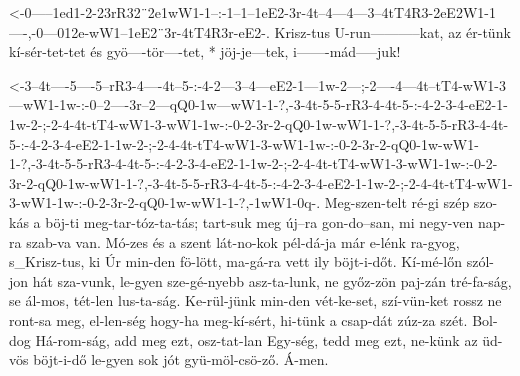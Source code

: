 





  {<-0-----1ed1-2-23rR32¨2e1wW1-1--:-1--1--1eE2-3r-4t--4---4---3--4tT4R3-2eE2W1-1----,-0---012e-wW1--1eE2¨3r-4tT4R3r-eE2-.}
  {  Krisz-tus  U-run-----------kat, az ér-tünk kí-sér-tet-tet és gyö----tör----tet, * jöj-je---tek, i-------mád-----juk!}



  {<-3--4t----5----5--rR3-4----4t--5-:-4-2---3--4---eE2-1---1w-2---;-2----4---4t--tT4-wW1-3---wW1-1w-:-0--2----3r--2---qQ0-1w---wW1-1-?,-3-4t-5-5-rR3-4-4t-5-:-4-2-3-4-eE2-1-1w-2-;-2-4-4t-tT4-wW1-3-wW1-1w-:-0-2-3r-2-qQ0-1w-wW1-1-?,-3-4t-5-5-rR3-4-4t-5-:-4-2-3-4-eE2-1-1w-2-;-2-4-4t-tT4-wW1-3-wW1-1w-:-0-2-3r-2-qQ0-1w-wW1-1-?,-3-4t-5-5-rR3-4-4t-5-:-4-2-3-4-eE2-1-1w-2-;-2-4-4t-tT4-wW1-3-wW1-1w-:-0-2-3r-2-qQ0-1w-wW1-1-?,-3-4t-5-5-rR3-4-4t-5-:-4-2-3-4-eE2-1-1w-2-;-2-4-4t-tT4-wW1-3-wW1-1w-:-0-2-3r-2-qQ0-1w-wW1-1-?,-1wW1-0q-.}
  {  Meg-szen-telt ré-gi  szép szo-kás a böj-ti meg-tar-tóz-ta-tás;  tart-suk meg új--ra  gon-do--san, mi negy-ven nap-ra  szab-va  van. Mó-zes és a szent lát-no-kok pél-dá-ja már e-lénk ra-gyog, s_Krisz-tus, ki Úr min-den fö-lött, ma-gá-ra vett ily böjt-i-dőt. Kí-mé-lőn szól-jon hát sza-vunk, le-gyen sze-gé-nyebb asz-ta-lunk, ne győz-zön paj-zán tré-fa-ság, se ál-mos, tét-len lus-ta-ság. Ke-rül-jünk min-den vét-ke-set, szí-vün-ket rossz ne ront-sa meg, el-len-ség hogy-ha meg-kí-sért, hi-tünk a csap-dát zúz-za szét. Bol-dog Há-rom-ság, add meg ezt, osz-tat-lan Egy-ség, tedd meg ezt, ne-künk az üd-vös böjt-i-dő le-gyen sok jót gyü-möl-csö-ző. Á-men.}

